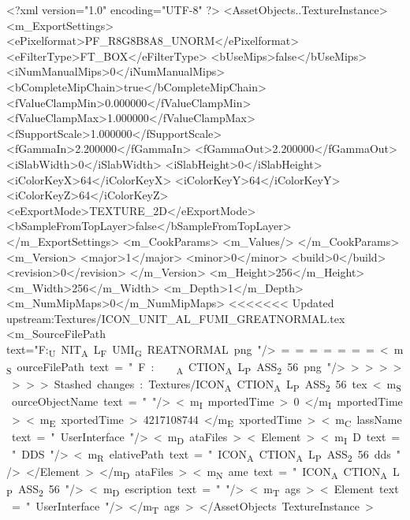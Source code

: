 <?xml version="1.0" encoding="UTF-8" ?>
<AssetObjects..TextureInstance>
	<m_ExportSettings>
		<ePixelformat>PF_R8G8B8A8_UNORM</ePixelformat>
		<eFilterType>FT_BOX</eFilterType>
		<bUseMips>false</bUseMips>
		<iNumManualMips>0</iNumManualMips>
		<bCompleteMipChain>true</bCompleteMipChain>
		<fValueClampMin>0.000000</fValueClampMin>
		<fValueClampMax>1.000000</fValueClampMax>
		<fSupportScale>1.000000</fSupportScale>
		<fGammaIn>2.200000</fGammaIn>
		<fGammaOut>2.200000</fGammaOut>
		<iSlabWidth>0</iSlabWidth>
		<iSlabHeight>0</iSlabHeight>
		<iColorKeyX>64</iColorKeyX>
		<iColorKeyY>64</iColorKeyY>
		<iColorKeyZ>64</iColorKeyZ>
		<eExportMode>TEXTURE_2D</eExportMode>
		<bSampleFromTopLayer>false</bSampleFromTopLayer>
	</m_ExportSettings>
	<m_CookParams>
		<m_Values/>
	</m_CookParams>
	<m_Version>
		<major>1</major>
		<minor>0</minor>
		<build>0</build>
		<revision>0</revision>
	</m_Version>
	<m_Height>256</m_Height>
	<m_Width>256</m_Width>
	<m_Depth>1</m_Depth>
	<m_NumMipMaps>0</m_NumMipMaps>
<<<<<<< Updated upstream:Textures/ICON_UNIT_AL_FUMI_GREATNORMAL.tex
	<m_SourceFilePath text="F:\DT\lilyimages\unit\ICON_UNIT_AL_FUMI_GREATNORMAL.png"/>
=======
	<m_SourceFilePath text="F:\DT\lilyimages\actionicon\ICON_ACTION_AL_PASS_256.png"/>
>>>>>>> Stashed changes:Textures/ICON_ACTION_AL_PASS_256.tex
	<m_SourceObjectName text=""/>
	<m_ImportedTime>0</m_ImportedTime>
	<m_ExportedTime>4217108744</m_ExportedTime>
	<m_ClassName text="UserInterface"/>
	<m_DataFiles>
		<Element>
			<m_ID text="DDS"/>
			<m_RelativePath text="ICON_ACTION_AL_PASS_256.dds"/>
		</Element>
	</m_DataFiles>
	<m_Name text="ICON_ACTION_AL_PASS_256"/>
	<m_Description text=""/>
	<m_Tags>
		<Element text="UserInterface"/>
	</m_Tags>
</AssetObjects..TextureInstance>


